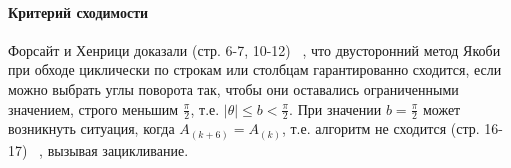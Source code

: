 \paragraph{Критерий сходимости}
Форсайт и Хенрици доказали (стр. 6-7, 10-12) ~\cite{Forsythe1960}, что двусторонний метод Якоби при обходе циклически по строкам или столбцам гарантированно сходится, если можно выбрать углы поворота так, чтобы они оставались ограниченными значением, строго меньшим $\frac{\pi}{2}$, т.е. $\left|\theta\right| \le b <\frac{\pi}{2}$. При значении $b = \frac{\pi}{2}$ может возникнуть ситуация, когда $A_{(k+6)}=A_{(k)}$, т.е. алгоритм не сходится (стр. 16-17) ~\cite{Forsythe1960}, вызывая зацикливание. 

